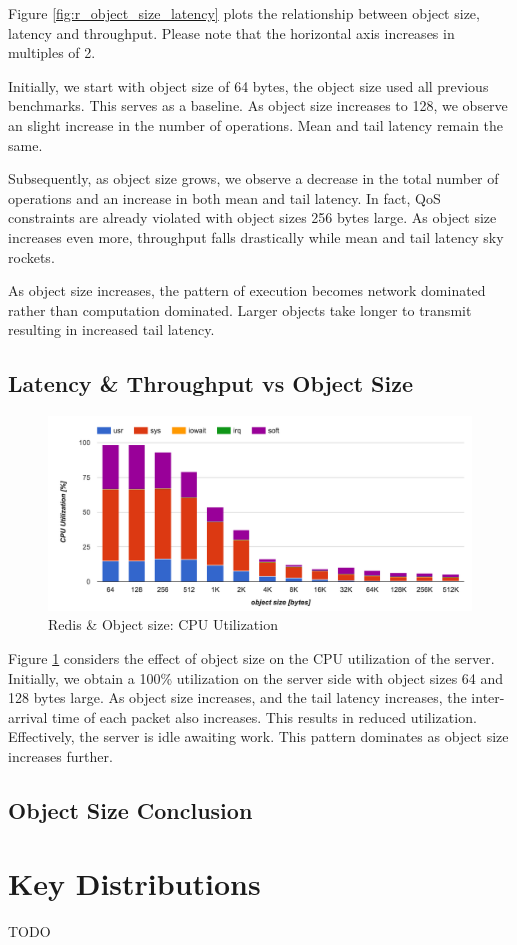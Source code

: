 Figure \ref{fig:r_object_size_latency} plots the relationship between object size, latency and throughput. Please note that the horizontal axis increases in multiples of 2.

Initially, we start with object size of 64 bytes, the object size used all previous benchmarks. This serves as a baseline. As object size increases to 128, we observe an slight increase in the number of operations. Mean and tail latency remain the same.

Subsequently, as object size grows, we observe a decrease in the total number of operations and an increase in both mean and tail latency. In fact, QoS constraints are already violated with object sizes 256 bytes large. As object size increases even more, throughput falls drastically while mean and tail latency sky rockets.

As object size increases, the pattern of execution becomes network dominated rather than computation dominated. Larger objects take longer to transmit resulting in increased tail latency.

\subsection{Latency \& Throughput vs Object Size}
\begin{figure}[h]
    \includegraphics[width=\textwidth]{./res2/r_object_size_cpu.png}
    \caption{Redis \& Object size: CPU Utilization}
    \label{fig:r_object_size_cpu}
\end{figure}

Figure \ref{fig:r_object_size_cpu} considers the effect of object size on the CPU utilization of the server. Initially, we obtain a 100\% utilization on the server side with object sizes 64 and 128 bytes large. As object size increases, and the tail latency increases, the inter-arrival time of each packet also increases. This results in reduced utilization. Effectively, the server is idle awaiting work. This pattern dominates as object size increases further.

\subsection{Object Size Conclusion}


\section{Key Distributions}
TODO